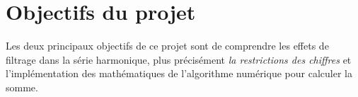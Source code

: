 \section{Objectifs du projet}
Les deux principaux objectifs de ce projet sont de comprendre les effets de
filtrage dans la s\'erie harmonique, plus pr\'ecis\'ement \textit{la restrictions
des chiffres} et l'impl\'ementation des math\'ematiques de l'algorithme
num\'erique pour calculer la somme.\\
